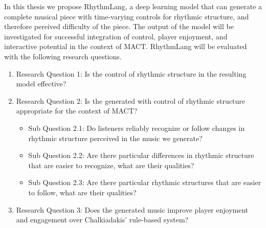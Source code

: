 In this thesis we propose RhythmLang, a deep learning model that can generate a complete musical piece with time-varying controls for rhythmic structure, and therefore pereived difficulty of the piece. The output of the model will be investigated for successful integration of control, player enjoyment, and interactive potential in the context of MACT. RhythmLang will be evaluated with the following research questions.
\begin{enumerate}
\item{Research Question 1}: Is the control of rhythmic structure in the resulting model effective?
\item{Research Question 2}: Is the generated with control of rhythmic structure appropriate for the context of MACT?
\begin{itemize}
\item{Sub Question 2.1}: Do listeners reliably recognize or follow changes in rhythmic structure perceived in the music we generate?
\item{Sub Question 2.2}: Are there particular differences in rhythmic structure that are easier to recognize, what are their qualities?
\item{Sub Question 2.3}: Are there particular rhythmic structures that are easier to follow, what are their qualities? 
\end{itemize}
\item {Research Question 3}: Does the generated music improve player enjoyment and engagement over Chalkiadakis' \cite{Chalkiadakis_2022} rule-based system? 
\end{enumerate}

